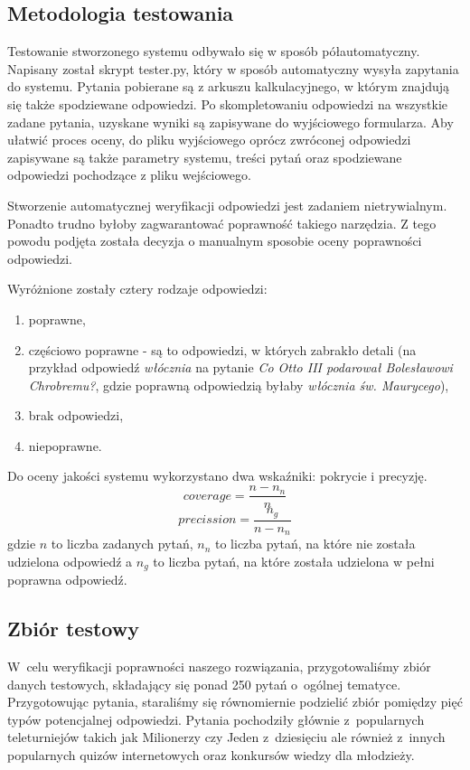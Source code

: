 \subsection{Metodologia testowania}
Testowanie stworzonego systemu odbywało się w sposób półautomatyczny. Napisany został skrypt tester.py, który w sposób automatyczny wysyła zapytania do systemu. Pytania pobierane są z arkuszu kalkulacyjnego, w którym znajdują się także spodziewane odpowiedzi. Po skompletowaniu odpowiedzi na wszystkie zadane pytania,  uzyskane wyniki są zapisywane do wyjściowego formularza. Aby ułatwić proces oceny, do pliku wyjściowego oprócz zwróconej odpowiedzi zapisywane są także parametry systemu, treści pytań oraz spodziewane odpowiedzi pochodzące z pliku wejściowego.

Stworzenie automatycznej weryfikacji odpowiedzi jest zadaniem nietrywialnym. Ponadto trudno byłoby zagwarantować poprawność takiego narzędzia. Z tego powodu podjęta została decyzja o manualnym sposobie oceny poprawności odpowiedzi.

Wyróżnione zostały cztery rodzaje odpowiedzi:
\begin{enumerate}
	\item poprawne,
	\item częściowo poprawne - są to odpowiedzi, w których zabrakło detali (na przykład odpowiedź \textit{włócznia} na pytanie \textit{Co Otto III podarował Bolesławowi Chrobremu?}, gdzie poprawną odpowiedzią byłaby \textit{włócznia św. Maurycego}),
	\item brak odpowiedzi, 
	\item niepoprawne.
\end{enumerate}

Do oceny jakości systemu wykorzystano dwa wskaźniki: pokrycie i precyzję.
\begin{equation}
		coverage =  \frac{n - n_n}{n}
	\end{equation}
\begin{equation}
		precission = \frac{n_g}{n - n_n}
\end{equation}
gdzie $n$ to liczba zadanych pytań, $n_n$ to liczba pytań, na które nie została udzielona odpowiedź a $n_g$ to liczba pytań, na które została udzielona w pełni poprawna odpowiedź. 

\subsection{Zbiór testowy}
W~celu weryfikacji poprawności naszego rozwiązania, przygotowaliśmy zbiór danych testowych, składający się ponad 250 pytań o~ogólnej tematyce. Przygotowując pytania, staraliśmy się równomiernie podzielić zbiór pomiędzy pięć typów potencjalnej odpowiedzi. Pytania pochodziły głównie z~popularnych teleturniejów takich jak Milionerzy czy Jeden z~dziesięciu ale również z~innych popularnych quizów internetowych oraz konkursów wiedzy dla młodzieży.

